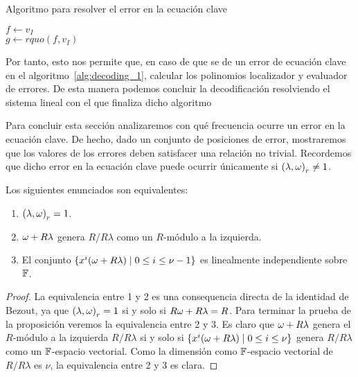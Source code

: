 \begin{algorithm}[H]
 \label{alg:failure_solver}
 \caption{Algoritmo para resolver el error en la ecuación clave}
 \(f \gets v_I\)\\
\(g \gets rquo(f, v_I)\)\\
\end{algorithm}

Por tanto, esto nos permite que, en caso de que se de un error de ecuación clave en el algoritmo~\ref{alg:decoding_1}, calcular los polinomios localizador y evaluador de errores. De esta manera podemos concluir la decodificación resolviendo el sistema lineal con el que finaliza dicho algoritmo

Para concluir esta sección analizaremos con qué frecuencia ocurre un error en la ecuación clave. De hecho, dado un conjunto de posiciones de error, mostraremos que los valores de los errores deben satisfacer una relación no trivial. Recordemos que dicho error en la ecuación clave puede ocurrir únicamente si \({(\lambda, \omega)}_r \neq 1\).

\begin{proposition}
    Los siguientes enunciados son equivalentes:
    \begin{enumerate}
        \item \({(\lambda, \omega)}_r = 1\).
        \item \(\omega + R\lambda\) genera  \(R / R\lambda\) como un \(R\)-módulo a la izquierda.
        \item El conjunto \( \{x^{i}(\omega + R\lambda)  \mid 0 \le i \le \nu -1\}\) es linealmente independiente sobre \(\mathbb{F}\).
    \end{enumerate}
\end{proposition}
\begin{proof}
    La equivalencia entre 1 y 2 es una consequencia directa de la identidad de Bezout, ya que \({(\lambda, \omega)}_r = 1\) si y solo si \(R\omega + R\lambda = R\). Para terminar la prueba de la proposición veremos la equivalencia entre 2 y 3. Es claro que \(\omega + R\lambda\) genera el \(R\)-módulo a la izquierda \(R / R\lambda\) si y solo si  \( \{x^{i}(\omega + R\lambda)  \mid 0 \le i \le \nu\} \) genera \(R / R\lambda\) como un  \(\mathbb{F}\)-espacio vectorial. Como la dimensión como \(\mathbb{F}\)-espacio vectorial de \(R / R\lambda\) es \(\nu\), la equivalencia entre 2 y 3 es clara.
\end{proof}

